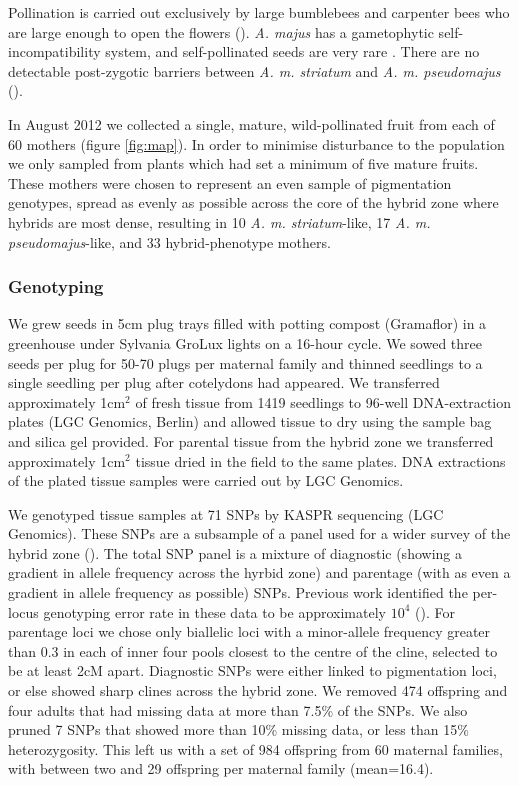 \documentclass[10pt, a4paper, twocolumn]{article} %
\begin{document}
Pollination is carried out exclusively by large bumblebees and carpenter bees who are large enough to open the flowers (\cite{vargas2010occluded, andalo2019prevalence}). \textit{A. majus} has a gametophytic self-incompatibility system, and self-pollinated seeds are very rare \parencite{surendranadh2022effects}. There are no detectable post-zygotic barriers between \textit{A. m. striatum} and \textit{A. m. pseudomajus} (\cite{andalo2010post}).

In August 2012 we collected a single, mature, wild-pollinated fruit from each of 60 mothers (figure \ref{fig:map}). In order to minimise disturbance to the population we only sampled from plants which had set a minimum of five mature fruits. These mothers were chosen to represent an even sample of pigmentation genotypes, spread as evenly as possible across the core of the hybrid zone where hybrids are most dense, resulting in 10 \textit{A. m. striatum}-like, 17 \textit{A. m. pseudomajus}-like, and 33 hybrid-phenotype mothers.

\subsubsection{Genotyping}

We grew seeds in 5cm plug trays filled with potting compost (Gramaflor) in a greenhouse under Sylvania GroLux lights on a 16-hour cycle. We sowed three seeds per plug for 50-70 plugs per maternal family and thinned seedlings to a single seedling per plug after cotelydons had appeared. We transferred approximately 1cm$^2$ of fresh tissue from 1419 seedlings to 96-well DNA-extraction plates (LGC Genomics, Berlin) and allowed tissue to dry using the sample bag and silica gel provided. For parental tissue from the hybrid zone we transferred approximately 1cm$^2$ tissue dried in the field to the same plates. DNA extractions of the plated tissue samples were carried out by LGC Genomics.

We genotyped tissue samples at 71 SNPs by KASPR sequencing (LGC Genomics).
These SNPs are a subsample of a panel used for a wider survey of the hybrid zone (\cite{surendranadh2022effects}).
The total SNP panel is a mixture of  diagnostic (showing a gradient in allele frequency across the hyrbid zone) and parentage (with as even a gradient in allele frequency as possible) SNPs.
Previous work identified the per-locus genotyping error rate in these data to be approximately $10^4$ (\cite{surendranadh2022effects}). For parentage loci we chose only biallelic loci with a minor-allele frequency greater than 0.3 in each of inner four pools closest to the centre of the cline, selected to be at least 2cM apart.
Diagnostic SNPs were either linked to pigmentation loci, or else showed sharp clines across the hybrid zone.
We removed 474 offspring and four adults that had missing data at more than 7.5\% of the SNPs. We also pruned 7 SNPs that showed more than 10\% missing data, or less than 15\% heterozygosity.
This left us with a set of 984 offspring from 60 maternal families, with between two and 29 offspring per maternal family (mean=16.4).
\end{document}

